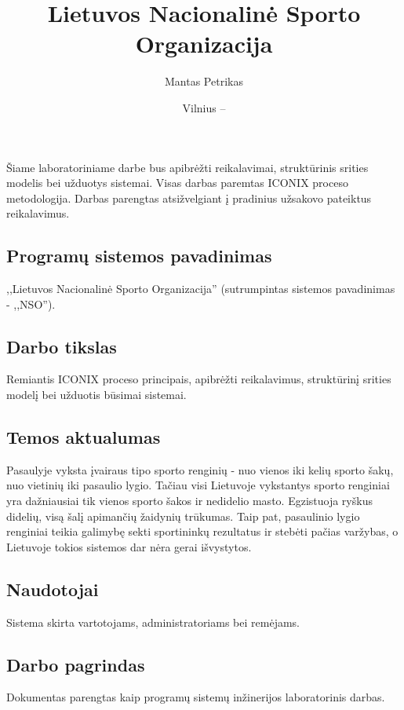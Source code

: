 \documentclass{VUMIFPSkursinis}
\title{Lietuvos Nacionalinė Sporto Organizacija}
\author{Mantas Petrikas}
\date{Vilnius – \the\year}
\begin{document}
    \maketitle
    \tableofcontents
    
     \label{anotacija}
		Šiame laboratoriniame darbe bus apibrėžti reikalavimai, struktūrinis srities modelis bei užduotys sistemai. Visas darbas paremtas ICONIX proceso metodologija.
		Darbas parengtas atsižvelgiant į pradinius užsakovo pateiktus reikalavimus.
     \label{ivadas}
        \subsection*{Programų sistemos pavadinimas} \label{ivadas_psPavadinimas}
            ,,Lietuvos Nacionalinė Sporto Organizacija'' (sutrumpintas sistemos pavadinimas - ,,NSO'').
        \subsection*{Darbo tikslas} \label{ivadas_darboTikslas}
            Remiantis ICONIX proceso principais, apibrėžti reikalavimus, struktūrinį srities modelį bei užduotis būsimai sistemai.
        \subsection*{Temos aktualumas} \label{ivadas_aktualumas}
            Pasaulyje vyksta įvairaus tipo sporto renginių - nuo vienos iki kelių sporto šakų, nuo vietinių iki pasaulio lygio. Tačiau visi Lietuvoje vykstantys sporto renginiai yra dažniausiai tik vienos sporto šakos ir nedidelio masto. Egzistuoja ryškus didelių, visą šalį apimančių žaidynių trūkumas. Taip pat, pasaulinio lygio renginiai teikia galimybę sekti sportininkų rezultatus ir stebėti pačias varžybas, o Lietuvoje tokios sistemos dar nėra gerai išvystytos.
        \subsection*{Naudotojai} \label{ivadas_naudotojai}
            Sistema skirta vartotojams, administratoriams bei remėjams.
        \subsection*{Darbo pagrindas} \label{ivadas_pagrindas}
            Dokumentas parengtas kaip programų sistemų inžinerijos laboratorinis darbas.
\end{document}
